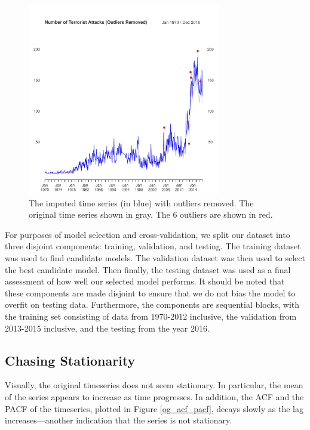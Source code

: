 \documentclass[11pt]{paper}
\begin{document}
\begin{figure}
\centering
    \includegraphics[width=0.75\textwidth]{../image/outlier_comparison.pdf}
\caption{The imputed time series (in blue) with outliers removed. The original time series shown in gray. The 6 outliers are shown in red. }
\label{outlier}
\end{figure}

For purposes of model selection and cross-validation, we split our dataset into three disjoint components: training, validation, and testing. The training dataset was used to find candidate models. The validation dataset was then used to select the best candidate model. Then finally, the testing dataset was used as a final assessment of how well our selected model performs. It should be noted that these components are made disjoint to ensure that we do not bias the model to overfit on testing data. Furthermore, the components are sequential blocks, with the training set consisting of data from 1970-2012 inclusive, the validation from 2013-2015 inclusive, and the testing from the year 2016.


\subsection{Chasing Stationarity}
Visually, the original timeseries does not seem stationary. In particular, the mean of the series appears to increase as time progresses. In addition, the ACF and the PACF of the timeseries, plotted in Figure \ref{og_acf_pacf}, decays slowly as the lag increases---another indication that the series is not stationary.
\end{document}
